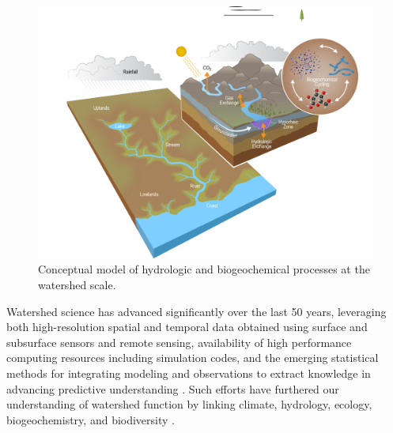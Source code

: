 \documentclass[preprint,review, 12pt]{elsarticle}
\begin{document}
\begin{figure}[hp]
\centering\includegraphics[width=1.0\linewidth]{EED0542_watershedModel.png}
\caption{Conceptual model of hydrologic and biogeochemical processes at the watershed scale.}
\end{figure} 

Watershed science has advanced significantly over the last 50 years, leveraging both high-resolution spatial and temporal data obtained using surface and subsurface sensors and remote sensing, availability of high performance computing resources including simulation codes, and the emerging statistical methods for integrating modeling and observations to extract knowledge in advancing predictive understanding \citep{kirchner2006getting, wagener2007catchment, kirchner2004fine, Hubbard2018, gooseff2007relating, Beven2006a, bear2013dynamics}. Such efforts have furthered our understanding of watershed function by linking climate, hydrology, ecology, biogeochemistry, and biodiversity \citep{Graham2019}.
\end{document}
